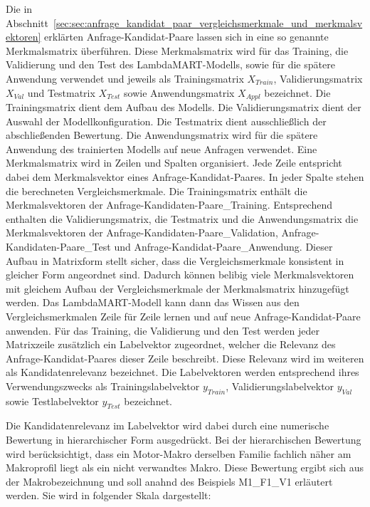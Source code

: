 Die in Abschnitt~\ref{sec:sec:anfrage_kandidat_paar_vergleichsmerkmale_und_merkmalsvektoren} erklärten Anfrage-Kandidat-Paare lassen sich in eine so genannte Merkmalsmatrix überführen.
Diese Merkmalsmatrix wird für das Training, die Validierung und den Test des LambdaMART-Modells, sowie für die spätere Anwendung verwendet und jeweils als Trainingsmatrix \(X_{Train}\), Validierungsmatrix \(X_{Val}\) und Testmatrix \(X_{Test}\) sowie Anwendungsmatrix \(X_{Appl}\) bezeichnet.
Die Trainingsmatrix dient dem Aufbau des Modells. Die Validierungsmatrix dient der Auswahl der Modellkonfiguration. Die Testmatrix dient ausschließlich der abschließenden Bewertung. Die Anwendungsmatrix wird für die spätere Anwendung des trainierten Modells auf neue Anfragen verwendet.
Eine Merkmalsmatrix wird in Zeilen und Spalten organisiert. Jede Zeile entspricht dabei dem Merkmalsvektor eines Anfrage-Kandidat-Paares. In jeder Spalte stehen die berechneten Vergleichsmerkmale. 
Die Trainingsmatrix enthält die Merkmalsvektoren der Anfrage-Kandidaten-Paare\_Training. Entsprechend enthalten die Validierungsmatrix, die Testmatrix und die Anwendungsmatrix die Merkmalsvektoren der Anfrage-Kandidaten-Paare\_Validation, Anfrage-Kandidaten-Paare\_Test und Anfrage-Kandidat-Paare\_Anwendung.
Dieser Aufbau in Matrixform stellt sicher, dass die Vergleichsmerkmale konsistent in gleicher Form angeordnet sind. Dadurch können belibig viele Merkmalsvektoren mit gleichem Aufbau der Vergleichsmerkmale der Merkmalsmatrix hinzugefügt werden. 
Das LambdaMART-Modell kann dann das Wissen aus den Vergleichsmerkmalen Zeile für Zeile lernen und auf neue Anfrage-Kandidat-Paare anwenden.
Für das Training, die Validierung und den Test werden jeder Matrixzeile zusätzlich ein Labelvektor zugeordnet, welcher die Relevanz des Anfrage-Kandidat-Paares dieser Zeile beschreibt.
Diese Relevanz wird im weiteren als Kandidatenrelevanz bezeichnet.
Die Labelvektoren werden entsprechend ihres Verwendungszwecks als Trainingslabelvektor \(y_{Train}\), 
Validierungslabelvektor \(y_{Val}\) sowie Testlabelvektor \(y_{Test}\) bezeichnet. 

Die Kandidatenrelevanz im Labelvektor wird dabei durch eine numerische Bewertung in hierarchischer Form ausgedrückt.
Bei der hierarchischen Bewertung wird berücksichtigt, dass ein Motor-Makro derselben Familie fachlich näher am Makroprofil liegt als ein nicht verwandtes Makro.
Diese Bewertung ergibt sich aus der Makrobezeichnung und soll anahnd des Beispiels M1\_F1\_V1 erläutert werden. Sie wird in folgender Skala dargestellt: 


